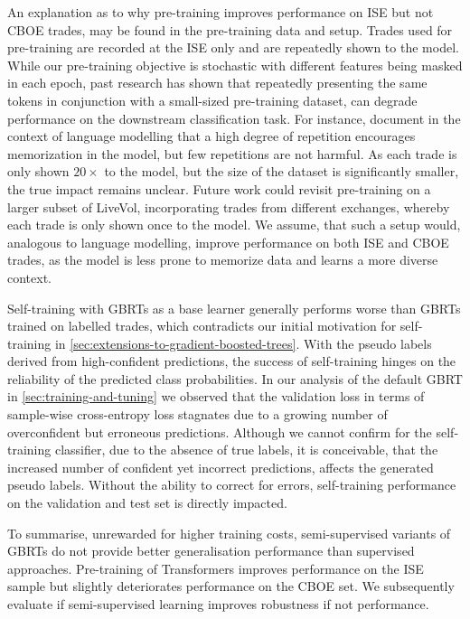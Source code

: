 An explanation as to why pre-training improves performance on \gls{ISE} but not \gls{CBOE} trades, may be found in the pre-training data and setup. Trades used for pre-training are recorded at the \gls{ISE} only and are repeatedly shown to the model. While our pre-training objective is stochastic with different features being masked in each epoch, past research has shown that repeatedly presenting the same tokens in conjunction with a small-sized pre-training dataset, can degrade performance on the downstream classification task. For instance, \textcite[][27--28]{raffelExploringLimitsTransfer2020} document in the context of language modelling that a high degree of repetition encourages memorization in the model, but few repetitions are not harmful. As each trade is only shown $20\times$ to the model, but the size of the dataset is significantly smaller, the true impact remains unclear. Future work could revisit pre-training on a larger subset of LiveVol, incorporating trades from different exchanges, whereby each trade is only shown once to the model. We assume, that such a setup would, analogous to language modelling, improve performance on both \gls{ISE} and \gls{CBOE} trades, as the model is less prone to memorize data and learns a more diverse context.

Self-training with \glspl{GBRT} as a base learner generally performs worse than \glspl{GBRT} trained on labelled trades, which contradicts our initial motivation for self-training in \cref{sec:extensions-to-gradient-boosted-trees}. With the pseudo labels derived from high-confident predictions, the success of self-training hinges on the reliability of the predicted class probabilities. In our analysis of the default \gls{GBRT} in \cref{sec:training-and-tuning} we observed that the validation loss in terms of sample-wise cross-entropy loss stagnates due to a growing number of overconfident but erroneous predictions. Although we cannot confirm for the self-training classifier, due to the absence of true labels, it is conceivable, that the increased number of confident yet incorrect predictions, affects the generated pseudo labels. Without the ability to correct for errors, self-training performance on the validation and test set is directly impacted.

To summarise, unrewarded for higher training costs, semi-supervised variants of \glspl{GBRT} do not provide better generalisation performance than supervised approaches. Pre-training of Transformers improves performance on the \gls{ISE} sample but slightly deteriorates performance on the \gls{CBOE} set. We subsequently evaluate if semi-supervised learning improves robustness if not performance.

